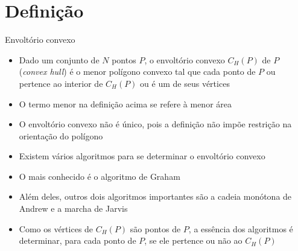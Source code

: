 \section{Definição}

\begin{frame}[fragile]{Envoltório convexo}

    \begin{itemize}
        \item Dado um conjunto de $N$ pontos $P$, o envoltório convexo $C_H(P)$ de $P$
        (\textit{convex hull}) é o menor polígono convexo tal que cada ponto de $P$ 
        ou pertence ao interior de $C_H(P)$ ou é um de seus vértices
        \pause

        \item O termo menor na definição acima se refere à menor área
        \pause

        \item O envoltório convexo não é único, pois a definição não impõe restrição na orientação
            do polígono
        \pause

        \item Existem vários algoritmos para se determinar o envoltório convexo
        \pause

        \item O mais conhecido é o algoritmo de Graham
        \pause

        \item Além deles, outros dois algoritmos importantes são a cadeia monótona de
        Andrew e a marcha de Jarvis
        \pause

        \item Como os vértices de $C_H(P)$ são pontos de $P$, a essência dos algoritmos é 
            determinar, para cada ponto de $P$, se ele pertence ou não ao $C_H(P)$

    \end{itemize}

\end{frame}


